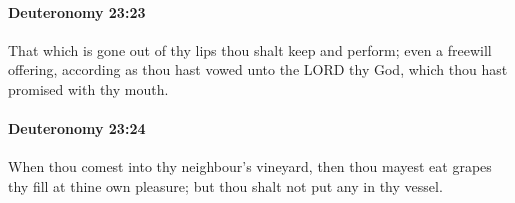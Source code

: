 		\paragraph{Deuteronomy 23:23} %
			\label{DEUTERONOMY-23-23}

			That which is gone out of thy lips thou shalt keep and perform; even a freewill offering, according as thou hast vowed unto the LORD thy God, which thou hast promised with thy mouth.


		\paragraph{Deuteronomy 23:24} %
			\label{DEUTERONOMY-23-24}

			When thou comest into thy neighbour's vineyard, then thou mayest eat grapes thy fill at thine own pleasure; but thou shalt not put any in thy vessel.


